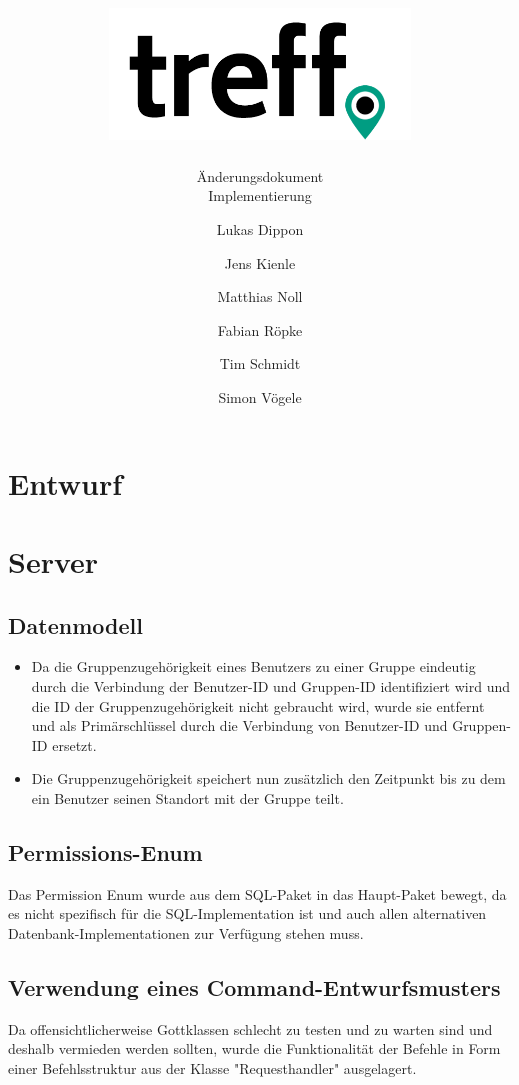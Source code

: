 \documentclass[parskip=full,11pt]{scrartcl}
\title{\includegraphics[width = 80mm]{images/logo_crop.png}}
\subtitle{\huge Änderungsdokument\\Implementierung}
\author{Lukas Dippon
        \and Jens Kienle
        \and Matthias Noll
        \and Fabian Röpke
        \and Tim Schmidt
        \and Simon Vögele}
\begin{document}
\maketitle
\thispagestyle{empty} %

\pagebreak
\tableofcontents

\pagebreak
\section{Entwurf}



\pagebreak
\section{Server}

\subsection{Datenmodell}
	\begin{itemize}
	\item Da die Gruppenzugehörigkeit eines Benutzers zu einer Gruppe eindeutig
		durch die Verbindung der Benutzer-ID und Gruppen-ID identifiziert wird
		und die ID der Gruppenzugehörigkeit nicht gebraucht wird, wurde sie
		entfernt und als Primärschlüssel durch die Verbindung von Benutzer-ID
		und Gruppen-ID ersetzt.
	\item Die Gruppenzugehörigkeit speichert nun zusätzlich den Zeitpunkt bis
		zu dem ein Benutzer seinen Standort mit der Gruppe teilt.
	\end{itemize}

\subsection{Permissions-Enum}
Das Permission Enum wurde aus dem SQL-Paket in das Haupt-Paket bewegt, da es
nicht spezifisch für die SQL-Implementation ist und auch allen alternativen
Datenbank-Implementationen zur Verfügung stehen muss.

\subsection{Verwendung eines Command-Entwurfsmusters}
Da offensichtlicherweise Gottklassen schlecht zu testen und zu warten sind und
deshalb vermieden werden sollten, wurde die Funktionalität der Befehle in Form
einer Befehlsstruktur aus der Klasse "Requesthandler" ausgelagert.
\end{document}
